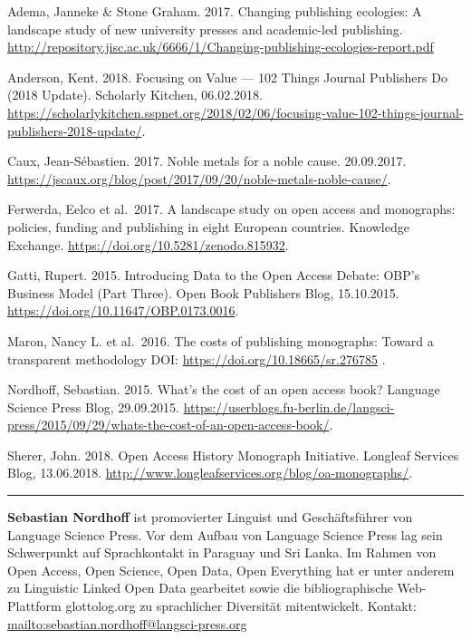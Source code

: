 \documentclass[a4paper,
fontsize=11pt,
oneside,
numbers=noperiodatend,
parskip=half-,
bibliography=totoc,
final
]{scrartcl}
\begin{document}
Adema, Janneke \& Stone Graham. 2017. Changing publishing ecologies: A
landscape study of new university presses and academic-led publishing.
\url{http://repository.jisc.ac.uk/6666/1/Changing-publishing-ecologies-report.pdf}

Anderson, Kent. 2018. Focusing on Value --- 102 Things Journal
Publishers Do (2018 Update). Scholarly Kitchen, 06.02.2018.
\url{https://scholarlykitchen.sspnet.org/2018/02/06/focusing-value-102-things-journal-publishers-2018-update/}.

Caux, Jean-Sébastien. 2017. Noble metals for a noble cause. 20.09.2017.
\url{https://jscaux.org/blog/post/2017/09/20/noble-metals-noble-cause/}.

Ferwerda, Eelco et al.~2017. A landscape study on open access and
monographs: policies, funding and publishing in eight European
countries. Knowledge Exchange.
\url{https://doi.org/10.5281/zenodo.815932}.

Gatti, Rupert. 2015. Introducing Data to the Open Access Debate: OBP's
Business Model (Part Three). Open Book Publishers Blog, 15.10.2015.
\url{https://doi.org/10.11647/OBP.0173.0016}.

Maron, Nancy L. et al.~2016. The costs of publishing monographs: Toward
a transparent methodology DOI: \url{https://doi.org/10.18665/sr.276785}
.

Nordhoff, Sebastian. 2015. What's the cost of an open access book?
Language Science Press Blog, 29.09.2015.
\url{https://userblogs.fu-berlin.de/langsci-press/2015/09/29/whats-the-cost-of-an-open-access-book/}.

Sherer, John. 2018. Open Access History Monograph Initiative. Longleaf
Services Blog, 13.06.2018.
\url{http://www.longleafservices.org/blog/oa-monographs/}.

\begin{center}\rule{0.5\linewidth}{\linethickness}\end{center}

\textbf{Sebastian Nordhoff} ist promovierter Linguist und
Geschäftsführer von Language Science Press. Vor dem Aufbau von Language
Science Press lag sein Schwerpunkt auf Sprachkontakt in Paraguay und Sri
Lanka. Im Rahmen von Open Access, Open Science, Open Data, Open
Everything hat er unter anderem zu Linguistic Linked Open Data
gearbeitet sowie die bibliographische Web-Plattform glottolog.org zu
sprachlicher Diversität mitentwickelt. Kontakt:
\url{mailto:sebastian.nordhoff@langsci-press.org}
\end{document}
